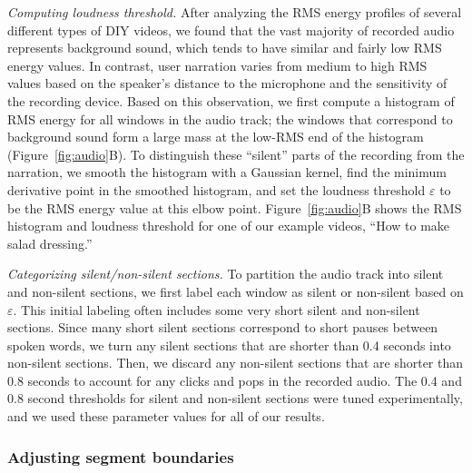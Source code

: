 \emph{Computing loudness threshold.} After analyzing the RMS energy
profiles of several different types of DIY videos, we found that the
vast majority of recorded audio represents background sound, which
tends to have similar and fairly low RMS energy values. In contrast,
user narration varies from medium to high RMS values based on the
speaker's distance to the microphone and the sensitivity of the
recording device. Based on this observation, we first compute a histogram
of RMS energy for all windows in the audio track; the windows that
correspond to background sound form a large mass at the low-RMS end of
the histogram (Figure~\ref{fig:audio}B).
%
To distinguish these ``silent'' parts of the recording from the
narration, we smooth the histogram with a Gaussian kernel, find the
minimum derivative point in the smoothed histogram, and set the
loudness threshold $\varepsilon$ to be the RMS energy value at this
elbow point.
%
Figure~\ref{fig:audio}B shows the RMS histogram and loudness threshold
for one of our example videos, ``How to make salad dressing.''

\emph{Categorizing silent/non-silent sections.} To partition the audio
track into silent and non-silent sections, we first label each window
as silent or non-silent based on $\varepsilon$.
%
This initial labeling often includes some very short silent and
non-silent sections.
%
Since many short silent sections correspond to short pauses between
spoken words, we turn any silent sections that are shorter than 0.4
seconds into non-silent sections.
%
Then, we discard any non-silent sections that are shorter than 0.8
seconds to account for any clicks and pops in the recorded audio.
%
The 0.4 and 0.8 second thresholds for silent and non-silent sections
were tuned experimentally, and we used these parameter values for all
of our results.

\subsubsection{Adjusting segment boundaries}

